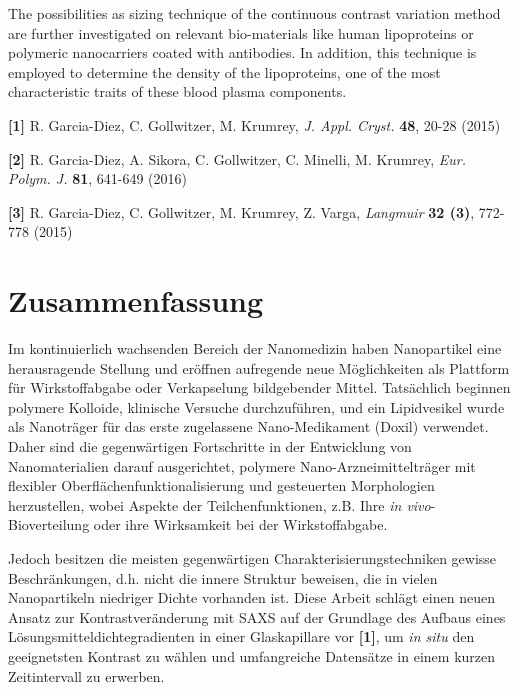 The possibilities as sizing technique of the continuous contrast variation method are further investigated on relevant bio-materials like human lipoproteins or polymeric nanocarriers coated with antibodies. In addition, this technique is employed to determine the density of the lipoproteins, one of the most characteristic traits of these blood plasma components.

\bigskip
\footnotesize{

\textbf{[1]} R. Garcia-Diez, C. Gollwitzer, M. Krumrey, \emph{J. Appl. Cryst.} \textbf{48}, 20-28 (2015)

\textbf{[2]} R. Garcia-Diez, A. Sikora, C. Gollwitzer, C. Minelli, M. Krumrey, \emph{Eur. Polym. J.} \textbf{81}, 641-649 (2016)

\textbf{[3]} R. Garcia-Diez, C. Gollwitzer, M. Krumrey, Z. Varga, \emph{Langmuir} \textbf{32 (3)}, 772-778 (2015)

}
\normalsize

\cleardoublepage

\thispagestyle{empty}

\chapter*{Zusammenfassung}

Im kontinuierlich wachsenden Bereich der Nanomedizin haben Nanopartikel eine herausragende Stellung und eröffnen aufregende neue Möglichkeiten als Plattform für Wirkstoffabgabe oder Verkapselung bildgebender Mittel. Tatsächlich beginnen polymere Kolloide, klinische Versuche durchzuführen, und ein Lipidvesikel wurde als Nanoträger für das erste zugelassene Nano-Medikament (Doxil) verwendet. Daher sind die gegenwärtigen Fortschritte in der Entwicklung von Nanomaterialien darauf ausgerichtet, polymere Nano-Arzneimittelträger mit flexibler Oberflächenfunktionalisierung und gesteuerten Morphologien herzustellen, wobei Aspekte der Teilchenfunktionen, z.B. Ihre \emph{in vivo}-Bioverteilung oder ihre Wirksamkeit bei der Wirkstoffabgabe.

Jedoch besitzen die meisten gegenwärtigen Charakterisierungstechniken gewisse Beschränkungen, d.h. nicht die innere Struktur beweisen, die in vielen Nanopartikeln niedriger Dichte vorhanden ist. Diese Arbeit schlägt einen neuen Ansatz zur Kontrastveränderung mit SAXS auf der Grundlage des Aufbaus eines Lösungsmitteldichtegradienten in einer Glaskapillare vor \textbf{[1]}, um \emph{in situ} den geeignetsten Kontrast zu wählen und umfangreiche Datensätze in einem kurzen Zeitintervall zu erwerben.

